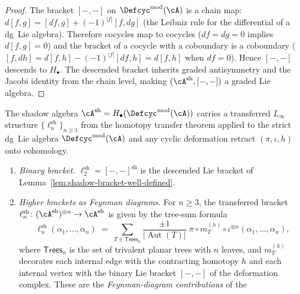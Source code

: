 \begin{proof}
The bracket $[-,-]$ on $\Defcyc^{\mathrm{mod}}(\cA)$ is a chain
map: $d[f,g] = [df, g] + (-1)^{|f|}[f, dg]$ (the Leibniz rule for
the differential of a dg~Lie algebra).  Therefore cocycles map to
cocycles ($df = dg = 0$ implies $d[f,g] = 0$) and the bracket of a
cocycle with a coboundary is a coboundary
($[f, dh] = d[f,h] - (-1)^{|f|}[df, h] = d[f,h]$ when $df = 0$).
Hence $[-,-]$ descends to $H_\bullet$.  The descended bracket
inherits graded antisymmetry and the Jacobi identity from the
chain level, making $(\cA^{\mathrm{sh}}, [-,-])$ a graded Lie
algebra.
\end{proof}

\begin{proposition}
\label{prop:shadow-algebra-linfty}
The shadow algebra $\cA^{\mathrm{sh}} =
H_\bullet(\Defcyc^{\mathrm{mod}}(\cA))$
carries a transferred $L_\infty$ structure
$\{\ell_n^{\mathrm{sh}}\}_{n \geq 1}$ from the homotopy transfer
theorem applied to the strict dg~Lie algebra
$\Defcyc^{\mathrm{mod}}(\cA)$ and any cyclic deformation retract
$(\pi, \iota, h)$ onto cohomology.
\begin{enumerate}[label=\textup{(\roman*)}]
\item \emph{Binary bracket.}
  $\ell_2^{\mathrm{sh}} = [-,-]^{\mathrm{sh}}$ is the descended
  Lie bracket of
  Lemma~\textup{\ref{lem:shadow-bracket-well-defined}}.
\item \emph{Higher brackets as Feynman diagrams.}
  For $n \geq 3$, the transferred bracket
  $\ell_n^{\mathrm{sh}}\colon
  (\cA^{\mathrm{sh}})^{\otimes n} \to \cA^{\mathrm{sh}}$ is
  given by the tree-sum formula
  \begin{equation}\label{eq:transferred-shadow-bracket}
  \ell_n^{\mathrm{sh}}(\alpha_1, \ldots, \alpha_n)
  \;=\;
  \sum_{T \in \mathsf{Trees}_n}
  \frac{\pm 1}{|\operatorname{Aut}(T)|}
  \;\pi \circ m_T^{(h)}
  \circ \iota^{\otimes n}
  (\alpha_1, \ldots, \alpha_n),
  \end{equation}
  where $\mathsf{Trees}_n$ is the set of trivalent planar trees
  with $n$ leaves, and $m_T^{(h)}$ decorates each internal edge
  with the contracting homotopy $h$ and each internal vertex with
  the binary Lie bracket $[-,-]$ of the deformation complex.
  These are the \emph{Feynman-diagram contributions} of the

\end{enumerate}
\end{proposition}
